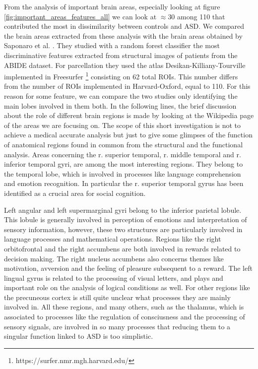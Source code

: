 \documentclass[11pt]{report}
\begin{document}
From the analysis of important brain areas, especially looking at figure \ref{fig:important_areas_features_all} we can look at $\approx 30$ among 110 that contributed the most in dissimilarity between controls and ASD.
We compared the brain areas extracted from these analysis with the brain areas obtained by Saponaro et al. \cite{saponaro2022}.
They studied with a random forest classifier the most discriminative features extracted from structural images of patients from the ABIDE dataset.
For parcellation they used the atlas Desikan-Killiany-Tourville implemented in Freesurfer \footnote{https://surfer.nmr.mgh.harvard.edu/} consisting on 62 total ROIs.
This number differs from the number of ROIs implemented in Harvard-Oxford, equal to 110.
For this reason for some feature, we can compare the two studies only identifying the main lobes involved in them both.
In the following lines, the brief discussion about the role of different brain regions is made by looking at the Wikipedia page of the areas we are focusing on.
The scope of this short investigation is not to achieve a medical accurate analysis but just to give some glimpses of the function of anatomical regions found in common from the structural and the functional analysis.
Areas concerning the r. superior temporal, r. middle temporal and r. inferior temporal gyri, are among the most interesting regions.
They belong to the temporal lobe, which is involved in processes like language comprehension and emotion recognition.
In particular the r. superior temporal gyrus has been identified as a crucial area for social cognition.

Left angular and left supermarginal gyri belong to the inferior parietal lobule.
This lobule is generally involved in perception of emotions and interpretation of sensory information, however, these two structures are particularly involved in language processes and mathematical operations.
Regions like the right orbitofrontal and the right accumbens are both involved in rewards related to decision making.
The right nucleus accumbens also concerns themes like motivation, avversion and the feeling of pleasure subsequent to a reward.
The left lingual gyrus is related to the processing of visual letters, and plays and important role on the analysis of logical conditions as well.
For other regions like the precuneous cortex is still quite unclear what processes they are mainly involved in.
All these regions, and many others, such as the thalamus, which is associated to processes like the regulation of consciusness and the processing of sensory signals, are involved in so many processes that reducing them to a singular function linked to ASD is too simplistic.
\end{document}

